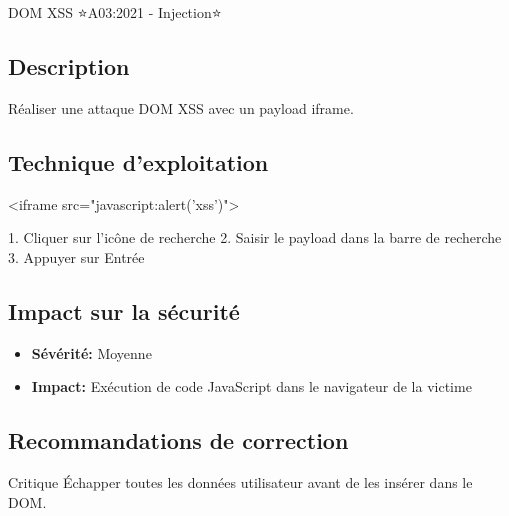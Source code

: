 \begin{vulnerability}{DOM XSS ⭐}{A03:2021 - Injection}{⭐}
    \subsection*{Description}
    Réaliser une attaque DOM XSS avec un payload iframe.
    
    \subsection*{Technique d'exploitation}
    \begin{payload}
<iframe src="javascript:alert('xss')">
    \end{payload}
    1. Cliquer sur l'icône de recherche
    2. Saisir le payload dans la barre de recherche
    3. Appuyer sur Entrée
    
    \subsection*{Impact sur la sécurité}
    \begin{itemize}
        \item \textbf{Sévérité:} Moyenne
        \item \textbf{Impact:} Exécution de code JavaScript dans le navigateur de la victime
    \end{itemize}
    
    \subsection*{Recommandations de correction}
    \begin{recommendation}{Critique}
        Échapper toutes les données utilisateur avant de les insérer dans le DOM.
    \end{recommendation}
\end{vulnerability}

